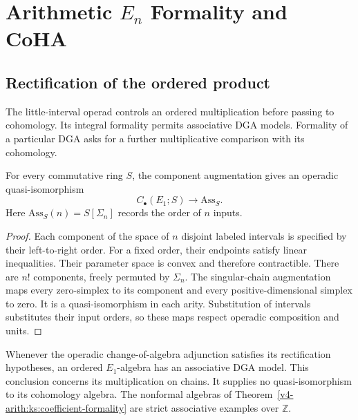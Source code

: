 \chapter{Arithmetic \(E_{n}\) Formality and CoHA}
\label{v4-arith:kontsevich-soibelman}

\section{Rectification of the ordered product}
\label{v4-arith:ks:E1-automatic}

The little-interval operad controls an ordered multiplication before
passing to cohomology. Its integral formality permits associative DGA
models. Formality of a particular DGA asks for a further multiplicative
comparison with its cohomology.

\begin{theorem}
\label{v4-arith:thm:E1-formality-automatic}
\ClaimStatusProvedHere{}
For every commutative ring $S$, the component augmentation gives an
operadic quasi-isomorphism
\[
 C_\bullet(E_1;S)\longrightarrow\mathrm{Ass}_S.
\]
Here $\mathrm{Ass}_S(n)=S[\Sigma_n]$ records the order of $n$ inputs.
\end{theorem}

\begin{proof}
Each component of the space of $n$ disjoint labeled intervals is
specified by their left-to-right order.
For a fixed order, their endpoints satisfy linear inequalities.
Their parameter space is convex and therefore contractible.
There are $n!$ components, freely permuted by $\Sigma_n$.
The singular-chain augmentation maps every zero-simplex to its
component and every positive-dimensional simplex to zero.
It is a quasi-isomorphism in each arity.
Substitution of intervals substitutes their input orders, so these
maps respect operadic composition and units.
\end{proof}

\begin{corollary}
\label{v4-arith:cor:ordered-E1-survives}
\ClaimStatusProvedHereConditional{}
Whenever the operadic change-of-algebra adjunction satisfies its
rectification hypotheses, an ordered $E_1$-algebra has an associative DGA model.
This conclusion concerns its multiplication on chains.
It supplies no quasi-isomorphism to its cohomology algebra.
The nonformal algebras of Theorem~\ref{v4-arith:ks:coefficient-formality}
are strict associative examples over $\mathbb Z$.
\end{corollary}

